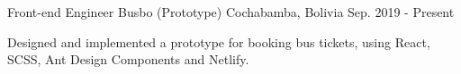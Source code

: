 \begin{cventries}
  \cventry
    {Front-end Engineer}
    {Busbo (Prototype)}
    {Cochabamba, Bolivia}
    {Sep. 2019 - Present}
    {
      \begin{cvitems}
        \item {Designed and implemented a prototype for booking bus tickets, using React, SCSS, Ant Design Components and Netlify.}
      \end{cvitems}
    }
\end{cventries}
